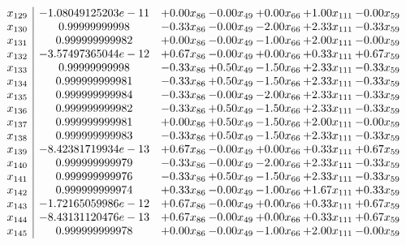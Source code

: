\documentclass[8pt]{article}
\begin{document}
\[\begin{array}{c| c c@{\hskip 2pt} c@{\hskip 2pt} c@{\hskip 2pt} c@{\hskip 2pt} c@{\hskip 2pt} }
 x_{129}   &  -1.08049125203e-11 & +  0.00 x_{86} & -0.00 x_{49} & +  0.00 x_{66} & +  1.00 x_{111} & -0.00 x_{59}\\
 x_{130}   &  0.99999999998 & -0.33 x_{86} & -0.00 x_{49} & -2.00 x_{66} & +  2.33 x_{111} & -0.33 x_{59}\\
 x_{131}   &  0.999999999982 & +  0.00 x_{86} & -0.00 x_{49} & -1.00 x_{66} & +  2.00 x_{111} & -0.00 x_{59}\\
 x_{132}   &  -3.57497365044e-12 & +  0.67 x_{86} & -0.00 x_{49} & +  0.00 x_{66} & +  0.33 x_{111} & +  0.67 x_{59}\\
 x_{133}   &  0.99999999998 & -0.33 x_{86} & +  0.50 x_{49} & -1.50 x_{66} & +  2.33 x_{111} & -0.33 x_{59}\\
 x_{134}   &  0.999999999981 & -0.33 x_{86} & +  0.50 x_{49} & -1.50 x_{66} & +  2.33 x_{111} & -0.33 x_{59}\\
 x_{135}   &  0.999999999984 & -0.33 x_{86} & -0.00 x_{49} & -2.00 x_{66} & +  2.33 x_{111} & -0.33 x_{59}\\
 x_{136}   &  0.999999999982 & -0.33 x_{86} & +  0.50 x_{49} & -1.50 x_{66} & +  2.33 x_{111} & -0.33 x_{59}\\
 x_{137}   &  0.999999999981 & +  0.00 x_{86} & +  0.50 x_{49} & -1.50 x_{66} & +  2.00 x_{111} & -0.00 x_{59}\\
 x_{138}   &  0.999999999983 & -0.33 x_{86} & +  0.50 x_{49} & -1.50 x_{66} & +  2.33 x_{111} & -0.33 x_{59}\\
 x_{139}   &  -8.42381719934e-13 & +  0.67 x_{86} & -0.00 x_{49} & +  0.00 x_{66} & +  0.33 x_{111} & +  0.67 x_{59}\\
 x_{140}   &  0.999999999979 & -0.33 x_{86} & -0.00 x_{49} & -2.00 x_{66} & +  2.33 x_{111} & -0.33 x_{59}\\
 x_{141}   &  0.999999999976 & -0.33 x_{86} & +  0.50 x_{49} & -1.50 x_{66} & +  2.33 x_{111} & -0.33 x_{59}\\
 x_{142}   &  0.999999999974 & +  0.33 x_{86} & -0.00 x_{49} & -1.00 x_{66} & +  1.67 x_{111} & +  0.33 x_{59}\\
 x_{143}   &  -1.72165059986e-12 & +  0.67 x_{86} & -0.00 x_{49} & +  0.00 x_{66} & +  0.33 x_{111} & +  0.67 x_{59}\\
 x_{144}   &  -8.43131120476e-13 & +  0.67 x_{86} & -0.00 x_{49} & +  0.00 x_{66} & +  0.33 x_{111} & +  0.67 x_{59}\\
 x_{145}   &  0.999999999978 & +  0.00 x_{86} & -0.00 x_{49} & -1.00 x_{66} & +  2.00 x_{111} & -0.00 x_{59}\\

\end{array}\]
\end{document}
